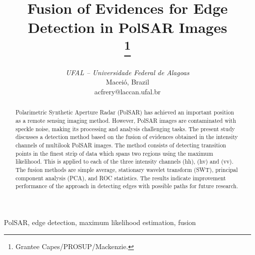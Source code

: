 \documentclass[conference]{IEEEtran}
\begin{document}
\title{Fusion of Evidences for Edge Detection in PolSAR Images\\
\thanks{Grantee Capes/PROSUP/Mackenzie.}
}
\author{
\and
{}
\and
{}
\textit{UFAL -- Universidade Federal de Alagoas}\\
Maceió, Brazil \\
acfrery@laccan.ufal.br}
\maketitle
\begin{abstract}
Polarimetric Synthetic Aperture Radar (PolSAR) has achieved an important position as a remote sensing imaging method. 
However, PolSAR images are contaminated with speckle noise, making its processing and analysis challenging tasks. 
The present study discusses a detection method based on the fusion of evidences obtained in the intensity channels of multilook PolSAR images.
The method consists of detecting transition points in the finest strip of data which spans two regions using the maximum likelihood.
This is applied to each of the three intensity channels (hh), (hv) and (vv). 
The fusion methods are simple average, stationary wavelet transform (SWT), principal component analysis (PCA), and ROC statistics.  
The results indicate improvement performance of the approach in detecting edges with possible paths for future research.
\end{abstract}

\begin{IEEEkeywords}
PolSAR, edge detection, maximum likelihood estimation, fusion
\end{IEEEkeywords}
\end{document}
